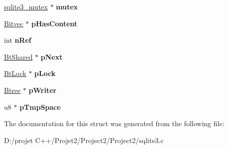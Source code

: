 \begin{DoxyCompactItemize}
\mbox{\hyperlink{structsqlite3__mutex}{sqlite3\+\_\+mutex}} $\ast$ {\bfseries mutex}
\item 
\mbox{\label{struct_bt_shared_ace6191dc3f48f9575d7946ab8cf5b919}} 
\mbox{\hyperlink{struct_bitvec}{Bitvec}} $\ast$ {\bfseries p\+Has\+Content}
\item 
\mbox{\label{struct_bt_shared_a43d0226fa08d7fae5f992f3a2d72cc08}} 
int {\bfseries n\+Ref}
\item 
\mbox{\label{struct_bt_shared_aaa9dd5c5d4ec2bb79ebe4b37ee926ae3}} 
\mbox{\hyperlink{struct_bt_shared}{Bt\+Shared}} $\ast$ {\bfseries p\+Next}
\item 
\mbox{\label{struct_bt_shared_af58c79eec88f99ed5a07d8cabf8a1d1a}} 
\mbox{\hyperlink{struct_bt_lock}{Bt\+Lock}} $\ast$ {\bfseries p\+Lock}
\item 
\mbox{\label{struct_bt_shared_ad8b2679e54027d58a3be3afcca4df1d6}} 
\mbox{\hyperlink{struct_btree}{Btree}} $\ast$ {\bfseries p\+Writer}
\item 
\mbox{\label{struct_bt_shared_a89102c20327da8a304f7e95af557bdf4}} 
u8 $\ast$ {\bfseries p\+Tmp\+Space}
\end{DoxyCompactItemize}


The documentation for this struct was generated from the following file\+:\begin{DoxyCompactItemize}
\item 
D\+:/projet C++/\+Projet2/\+Project2/\+Project2/sqlite3.\+c\end{DoxyCompactItemize}
